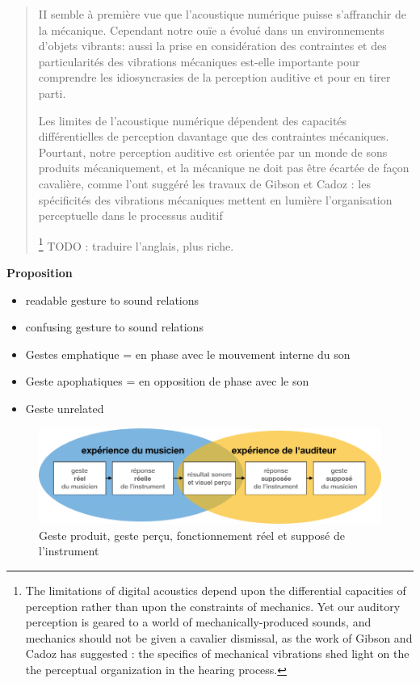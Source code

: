 \begin{quotation}
II semble à première vue que l'acoustique numérique puisse s'affranchir de la mécanique. Cependant notre ouïe a évolué dans un environnements d'objets vibrants: aussi la prise en considération des contraintes et des particularités des vibrations mécaniques est-elle importante pour comprendre les idiosyncrasies de la perception auditive et pour en tirer parti.

Les limites de l'acoustique numérique dépendent des capacités différentielles de perception davantage que des contraintes mécaniques. Pourtant, notre perception auditive est orientée par un monde de sons produits mécaniquement, et la mécanique ne doit pas être écartée de façon cavalière, comme l'ont suggéré les travaux de Gibson et Cadoz : les spécificités des vibrations mécaniques mettent en lumière l'organisation perceptuelle dans le processus auditif


\footnote{The limitations of digital acoustics depend upon the differential capacities of perception rather than upon the constraints of mechanics. Yet our auditory perception is geared to a world of mechanically-produced sounds, and mechanics should not be given a cavalier dismissal, as the work of Gibson and Cadoz has suggested : the specifics of mechanical vibrations shed light on the the perceptual organization in the hearing process.} TODO : traduire l'anglais, plus riche.
\end{quotation}


\textbf{Proposition}
\vspace{-1em}
\begin{itemize}[noitemsep]
\item readable gesture to sound relations
\item confusing gesture to sound relations
\end{itemize}

\vspace{-1em}
\begin{itemize}[noitemsep]
\item Gestes emphatique = en phase avec le mouvement interne du son
\item Geste apophatiques = en opposition de phase avec le son
\item Geste unrelated
\end{itemize}

\begin{figure}[!htbp]
	\includegraphics[width=\textwidth]{gfx/03_gesture/gesteReelGesteSuppose.jpg}
	\caption{Geste produit, geste perçu, fonctionnement réel et supposé de l'instrument}
	\label{fig:gesture:RealVsSupposed}
\end{figure}


